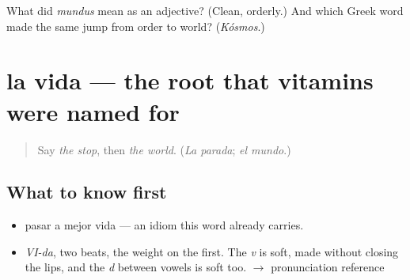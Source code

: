 \begin{tcolorbox}[breakable,colback=teal!4,colframe=teal!35!black,title={Before you move on}]
What did \emph{mundus} mean as an adjective? (Clean, orderly.) And which Greek word made the same jump from order to world? (\emph{Kósmos}.)
\end{tcolorbox}
\section[la vida]{la vida — the root that vitamins were named for}

\label{lesson:ES-C330-vida}



\begin{quote}
Say \emph{the stop}, then \emph{the world}. (\emph{La parada}; \emph{el mundo}.)
\end{quote}

\subsection*{What to know first}
\begin{itemize}
\raggedright
  \item pasar a mejor vida — an idiom this word already carries.
\end{itemize}

\begin{sounds}
\begin{itemize}
\raggedright
  \item \emph{VI-da}, two beats, the weight on the first. The \emph{v} is soft, made without closing the lips, and the \emph{d} between vowels is soft too. $\to$ pronunciation reference
\end{itemize}
\end{sounds}

